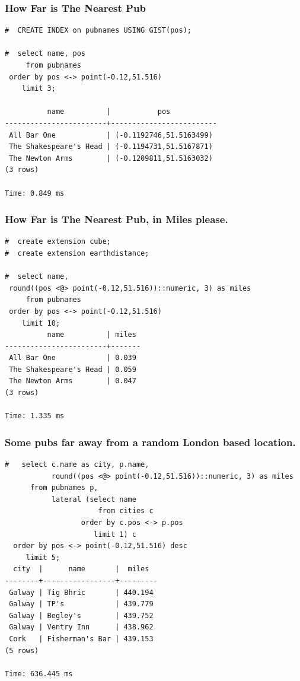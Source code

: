 \documentclass{beamer}
\begin{document}
\begin{frame}[fragile]
  \frametitle{How Far is The Nearest Pub}

  \vfill

\begin{verbatim}
#  CREATE INDEX on pubnames USING GIST(pos);

#  select name, pos
     from pubnames
 order by pos <-> point(-0.12,51.516)
    limit 3;

          name          |           pos           
------------------------+-------------------------
 All Bar One            | (-0.1192746,51.5163499)
 The Shakespeare's Head | (-0.1194731,51.5167871)
 The Newton Arms        | (-0.1209811,51.5163032)
(3 rows)

Time: 0.849 ms
\end{verbatim}  
\end{frame}

\begin{frame}[fragile]
  \frametitle{How Far is The Nearest Pub, in Miles please.}

\begin{verbatim}
#  create extension cube;
#  create extension earthdistance;

#  select name,
 round((pos <@> point(-0.12,51.516))::numeric, 3) as miles
     from pubnames
 order by pos <-> point(-0.12,51.516)
    limit 10;
          name          | miles 
------------------------+-------
 All Bar One            | 0.039
 The Shakespeare's Head | 0.059
 The Newton Arms        | 0.047
(3 rows)

Time: 1.335 ms
\end{verbatim}  
\end{frame}

\begin{frame}[fragile]
  \frametitle{Some pubs far away from a random London based location.}

\begin{verbatim}
#   select c.name as city, p.name,
           round((pos <@> point(-0.12,51.516))::numeric, 3) as miles
      from pubnames p,
           lateral (select name
                      from cities c
                  order by c.pos <-> p.pos
                     limit 1) c
  order by pos <-> point(-0.12,51.516) desc
     limit 5;
  city  |      name       |  miles  
--------+-----------------+---------
 Galway | Tig Bhric       | 440.194
 Galway | TP's            | 439.779
 Galway | Begley's        | 439.752
 Galway | Ventry Inn      | 438.962
 Cork   | Fisherman's Bar | 439.153
(5 rows)

Time: 636.445 ms
\end{verbatim}  
\end{frame}
\end{document}

